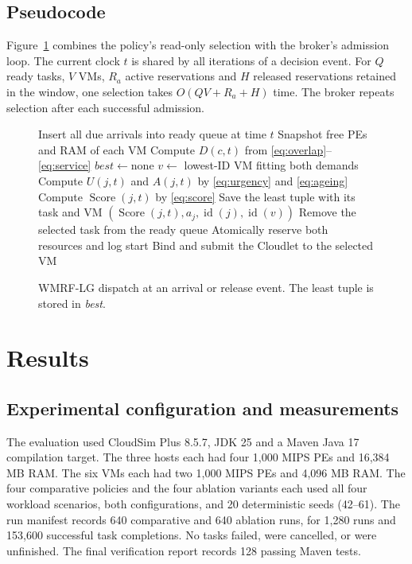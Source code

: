 \documentclass[conference]{IEEEtran}
\begin{document}
\subsection{Pseudocode}
Figure~\ref{fig:pseudocode} combines the policy's read-only selection with the broker's admission loop. The current clock $t$ is shared by all iterations of a decision event. For $Q$ ready tasks, $V$ VMs, $R_a$ active reservations and $H$ released reservations retained in the window, one selection takes $O(QV+R_a+H)$ time. The broker repeats selection after each successful admission.

\begin{figure}[t]
\raggedright
\begin{algorithmic}[1]
\State Insert all due arrivals into ready queue at time $t$
\Loop
  \State Snapshot free PEs and RAM of each VM
  \State Compute $D(c,t)$ from \eqref{eq:overlap}--\eqref{eq:service}
  \State $\mathit{best}\gets\text{none}$
    \State $v\gets$ lowest-ID VM fitting both demands
      \State Compute $U(j,t)$ and $A(j,t)$ by \eqref{eq:urgency} and \eqref{eq:ageing}
      \State Compute $\operatorname{Score}(j,t)$ by \eqref{eq:score}
      \State Save the least tuple with its task and VM
      \Statex \hspace{\algorithmicindent} $(\operatorname{Score}(j,t),a_j,\operatorname{id}(j),\operatorname{id}(v))$
    \EndIf
  \EndFor
    \State \Return
  \EndIf
  \State Remove the selected task from the ready queue
  \State Atomically reserve both resources and log start
  \State Bind and submit the Cloudlet to the selected VM
\EndLoop
\end{algorithmic}
\caption{WMRF-LG dispatch at an arrival or release event. The least tuple is stored in \textit{best}.}
\label{fig:pseudocode}
\end{figure}

\section{Results}
\subsection{Experimental configuration and measurements}
The evaluation used CloudSim Plus 8.5.7, JDK 25 and a Maven Java 17 compilation target. The three hosts each had four 1,000 MIPS PEs and 16,384 MB RAM. The six VMs each had two 1,000 MIPS PEs and 4,096 MB RAM. The four comparative policies and the four ablation variants each used all four workload scenarios, both configurations, and 20 deterministic seeds (42--61). The run manifest records 640 comparative and 640 ablation runs, for 1,280 runs and 153,600 successful task completions. No tasks failed, were cancelled, or were unfinished. The final verification report records 128 passing Maven tests.
\end{document}
